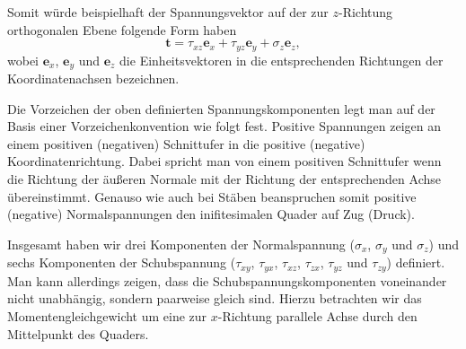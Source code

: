 \documentclass{lecture}
\begin{document}
    Somit würde beispielhaft der Spannungsvektor auf der zur \(z\)-Richtung orthogonalen Ebene folgende Form haben
    \[
        \bm{t} = \tau_{xz}\bm{e}_x + \tau_{yz}\bm{e}_y + \sigma_z\bm{e}_z,
    \]
    wobei \(\bm{e}_x\), \(\bm{e}_y\) und \(\bm{e}_z\) die Einheitsvektoren in die entsprechenden Richtungen der Koordinatenachsen bezeichnen.

    Die Vorzeichen der oben definierten Spannungskomponenten legt man auf der Basis einer Vorzeichenkonvention wie folgt fest.
    Positive Spannungen zeigen an einem positiven (negativen) Schnittufer in die positive (negative) Koordinatenrichtung.
    Dabei spricht man von einem positiven Schnittufer wenn die Richtung der äußeren Normale mit der Richtung der entsprechenden Achse übereinstimmt.
    Genauso wie auch bei Stäben beanspruchen somit positive (negative) Normalspannungen den inifitesimalen Quader auf Zug (Druck).
    \begin{center}
    \end{center}
    Insgesamt haben wir drei Komponenten der Normalspannung (\(\sigma_x\), \(\sigma_y\) und \(\sigma_z\)) und sechs Komponenten der Schubspannung (\(\tau_{xy}\), \(\tau_{yx}\), \(\tau_{xz}\), \(\tau_{zx}\), \(\tau_{yz}\) und \(\tau_{zy}\)) definiert.
    Man kann allerdings zeigen, dass die Schubspannungskomponenten voneinander nicht unabhängig, sondern paarweise gleich sind.
    Hierzu betrachten wir das Momentengleichgewicht um eine zur \(x\)-Richtung parallele Achse durch den Mittelpunkt des Quaders.
\end{document}
